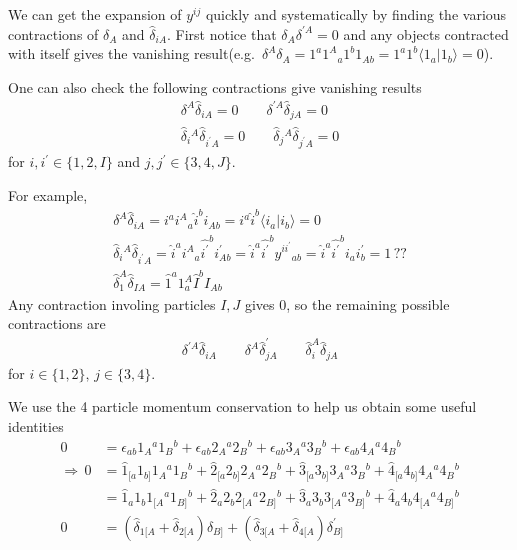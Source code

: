 \documentclass[12pt]{article}
\newcommand{\inner}[2]{\langle #1 | #2 \rangle}
\begin{document}
We can get the expansion of $y^{ij}$ quickly and systematically by finding the various contractions of $\delta_A$ and $\hat{\delta}_{iA}$. First notice that $\delta_A \delta^{\prime A}=0$ and any objects contracted with itself
gives the vanishing result(e.g. $\, \delta^A \delta_A=1^a 1^A{}_a 1^b 1_{A b}=1^a1^b\inner{1_a}{1_b}=0$).

One can also check the following contractions give vanishing results
\begin{gather}
    \delta^A \hat{\delta}_{iA}=0 \qquad \delta^{\prime A}\hat{\delta}_{jA}=0\\
    \hat{\delta}_i{}^A\hat{\delta}_{i^\prime A}=0 \qquad \hat{\delta}_j{}^A\hat{\delta}_{j^\prime A}=0
\end{gather}
for $i,i^\prime \in \{1,2,I\}$ and $j,j^\prime \in \{3,4,J\}$.

For example,
\begin{gather}
    \delta^A \hat{\delta}_{iA}=i^ai^A{}_a \hat{i}^b i_{Ab}=i^a\hat{i}^b\inner{i_a}{i_b}=0\\
    \hat{\delta}_i{}^A\hat{\delta}_{i^\prime A}=\hat{i}^a i^A{}_{a} \hat{i^\prime}^b i^\prime_{Ab}=\hat{i}^a\hat{i^\prime}^b y^{ii^\prime}{}_{ab}=\hat{i}^a\hat{i^\prime}^b i_a i^\prime _b=1 \,??\\
    \hat{\delta}_1^A\hat{\delta}_{IA}=\hat{1}^a1^A_a\hat{I}^bI_{Ab}
\end{gather}
Any contraction involing particles $I,J$ gives 0, so the remaining possible contractions are 
\begin{gather}
    \delta^{\prime A}\hat{\delta}_{iA}\qquad \delta^{ A}\hat{\delta}^\prime_{jA}\qquad \hat{\delta}^A_i\hat{\delta}_{jA}
\end{gather}
for $i\in \{1,2\},\, j\in \{3,4\}$.

We use the 4 particle momentum conservation to help us obtain some useful identities
\begin{align}
    0&=\epsilon_{ab}1_A{}^a1_B{}^b+\epsilon_{ab}2_A{}^a2_B{}^b+\epsilon_{ab}3_A{}^a3_B{}^b+\epsilon_{ab}4_A{}^a4_B{}^b\\
    \Longrightarrow \,0&=\hat{1}_{[a}1_{b]}1_A{}^a1_B{}^b+\hat{2}_{[a}2_{b]}2_A{}^a2_B{}^b+\hat{3}_{[a}3_{b]}3_A{}^a3_B{}^b+\hat{4}_{[a}4_{b]}4_A{}^a4_B{}^b\\
    &=\hat{1}_a1_b1_{[A}{}^a1_{B]}{}^b+\hat{2}_a2_b2_{[A}{}^a2_{B]}{}^b+\hat{3}_a3_b3_{[A}{}^a3_{B]}{}^b+\hat{4}_a4_b4_{[A}{}^a4_{B]}{}^b\\
    0&=(\hat{\delta}_{1[A}+\hat{\delta}_{2[A})\delta_{B]}+(\hat{\delta}_{3[A}+\hat{\delta}_{4[A})\delta^\prime_{B]}
\end{align}
\end{document}
